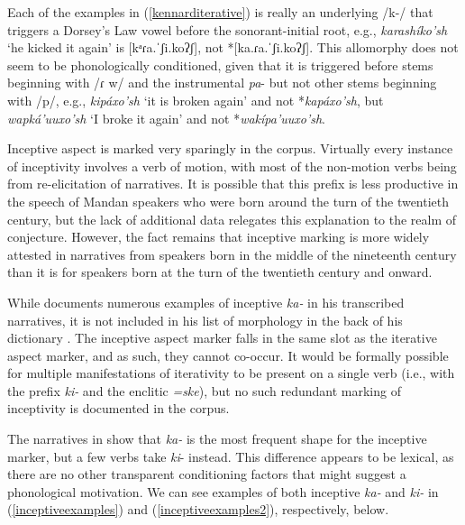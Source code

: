 Each of the examples in (\ref{kennarditerative}) is really an underlying /k-/ that triggers a Dorsey's Law vowel before the sonorant-initial root, e.g., \textit{karashíko'sh} `he kicked it again' is [kᵃɾa.ˈʃi.koʔʃ], not *[ka.ɾa.ˈʃi.koʔʃ]. This allomorphy does not seem to be phonologically conditioned, given that it is triggered before stems beginning with /ɾ w/ and the instrumental \textit{pa}- but not other stems beginning with /p/, e.g., \textit{kipáxo'sh} `it is broken again' and not *\textit{kapáxo'sh}, but \textit{wapká'uuxo'sh} `I broke it again' and not *\textit{wakípa'uuxo'sh}.%

\label{inceptiveprefix}

Inceptive aspect is marked very sparingly in the corpus. Virtually every instance of inceptivity involves a verb of motion, with most of the non-motion verbs being from  re-elicitation of  narratives. It is possible that this prefix is less productive in the speech of Mandan speakers who were born around the turn of the twentieth century, but the lack of additional data relegates this explanation to the realm of conjecture. However, the fact remains that inceptive marking is more widely attested in narratives from speakers born in the middle of the nineteenth century than it is for speakers born at the turn of the twentieth century and onward.

While \citet{hollow1973a} documents numerous examples of inceptive \textit{ka-} in his transcribed narratives, it is not included in his list of morphology in the back of his dictionary \citep{hollow1970}. The inceptive aspect marker falls in the same slot as the iterative aspect marker, and as such, they cannot co-occur. It would be formally possible for multiple manifestations of iterativity to be present on a single verb (i.e., with the prefix \textit{ki-} and the enclitic \textit{=ske}), but no such redundant marking of inceptivity is documented in the corpus.

The narratives in \citet{hollow1973a} show that \textit{ka-} is the most frequent shape for the inceptive marker, but a few verbs take \textit{ki}- instead. This difference appears to be lexical, as there are no other transparent conditioning factors that might suggest a phonological motivation. We can see examples of both inceptive \textit{ka-} and \textit{ki-} in (\ref{inceptiveexamples}) and (\ref{inceptiveexamples2}), respectively, below.

